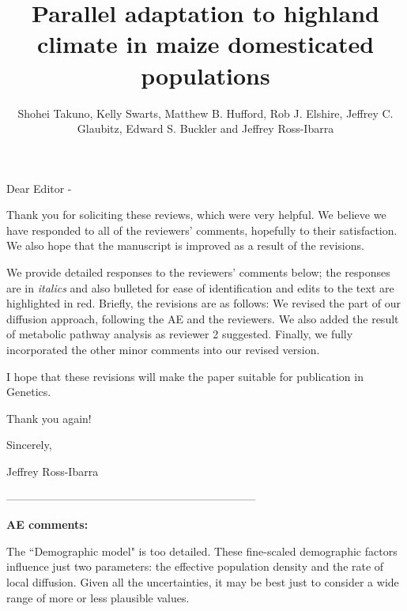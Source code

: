\documentclass[onecolumn,oneside,letterpaper]{article}
\title{Parallel adaptation to highland climate in maize domesticated populations}
\author{
 Shohei Takuno, Kelly Swarts, Matthew B. Hufford, Rob J. Elshire, Jeffrey C. Glaubitz, Edward S. Buckler and Jeffrey Ross-Ibarra
   }
\begin{document}
\maketitle
Dear Editor - 

Thank you for soliciting these reviews, which were very helpful.   We believe we have responded to all of the reviewers' comments, hopefully to their satisfaction.  We also hope that the manuscript is improved as a result of the revisions.  

We provide detailed responses to the reviewers' comments below; the responses are in \textit{italics} and also bulleted for ease of identification and edits to the text are highlighted in red.
Briefly, the revisions are as follows:  
We revised the part of our diffusion approach, following the AE and the reviewers.  We also added the result of metabolic pathway analysis as reviewer 2 suggested.  Finally, we fully incorporated the other minor comments into our revised version.  

I hope that these revisions will make the paper suitable for publication in Genetics. 

Thank you again! 

Sincerely, 

Jeffrey Ross-Ibarra

--------------------------------------------------------------------


\textbf{AE comments:}

The ``Demographic model" is too detailed.  These fine-scaled demographic factors influence just two parameters: 
the effective population density and the rate of local diffusion.  
Given all the uncertainties, it may be best just to consider a wide range of more or less plausible values. 

\end{document}
